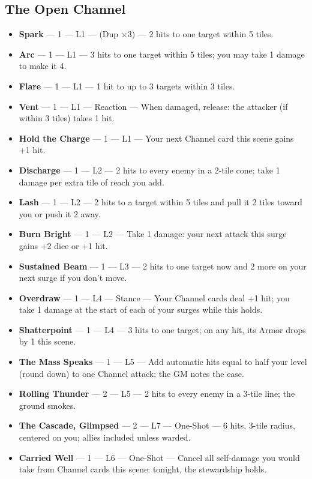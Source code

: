 \subsection{The Open Channel}
\begin{itemize}
    \item \textbf{Spark} --- 1 --- L1 --- (Dup ×3) --- 2 hits to one target within 5 tiles.
    \item \textbf{Arc} --- 1 --- L1 --- 3 hits to one target within 5 tiles; you may take 1 damage to make it 4.
    \item \textbf{Flare} --- 1 --- L1 --- 1 hit to up to 3 targets within 3 tiles.
    \item \textbf{Vent} --- 1 --- L1 --- Reaction --- When damaged, release: the attacker (if within 3 tiles) takes 1 hit.
    \item \textbf{Hold the Charge} --- 1 --- L1 --- Your next Channel card this scene gains +1 hit.
    \item \textbf{Discharge} --- 1 --- L2 --- 2 hits to every enemy in a 2-tile cone; take 1 damage per extra tile of reach you add.
    \item \textbf{Lash} --- 1 --- L2 --- 2 hits to a target within 5 tiles and pull it 2 tiles toward you or push it 2 away.
    \item \textbf{Burn Bright} --- 1 --- L2 --- Take 1 damage: your next attack this surge gains +2 dice or +1 hit.
    \item \textbf{Sustained Beam} --- 1 --- L3 --- 2 hits to one target now and 2 more on your next surge if you don't move.
    \item \textbf{Overdraw} --- 1 --- L4 --- Stance --- Your Channel cards deal +1 hit; you take 1 damage at the start of each of your surges while this holds.
    \item \textbf{Shatterpoint} --- 1 --- L4 --- 3 hits to one target; on any hit, its Armor drops by 1 this scene.
    \item \textbf{The Mass Speaks} --- 1 --- L5 --- Add automatic hits equal to half your level (round down) to one Channel attack; the GM notes the ease.
    \item \textbf{Rolling Thunder} --- 2 --- L5 --- 2 hits to every enemy in a 3-tile line; the ground smokes.
    \item \textbf{The Cascade, Glimpsed} --- 2 --- L7 --- One-Shot --- 6 hits, 3-tile radius, centered on you; allies included unless warded.
    \item \textbf{Carried Well} --- 1 --- L6 --- One-Shot --- Cancel all self-damage you would take from Channel cards this scene: tonight, the stewardship holds.
\end{itemize}

